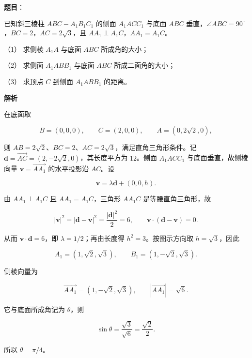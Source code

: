 \begin{answer}

\textbf{题目}：

已知斜三棱柱 $ABC-A_1B_1C_1$ 的侧面 $A_1ACC_1$ 与底面 $ABC$ 垂直，$\angle ABC=90^\circ$，$BC=2$，$AC=2\sqrt3$，且 $AA_1\perp A_1C$，$AA_1=A_1C$。

（1） 求侧棱 $A_1A$ 与底面 $ABC$ 所成角的大小；

（2） 求侧面 $A_1ABB_1$ 与底面 $ABC$ 所成二面角的大小；

（3） 求顶点 $C$ 到侧面 $A_1ABB_1$ 的距离。
\nopagebreak[4]
\begin{center}\end{center}
\nopagebreak[4]
\textbf{解析}

在底面取

\nopagebreak[4]
\[
B=(0,0,0),\qquad C=(2,0,0),\qquad A=(0,2\sqrt2,0),
\]

则 $AB=2\sqrt2$、$BC=2$、$AC=2\sqrt3$，满足直角三角形条件。记 $\boldsymbol d=\overrightarrow{AC}=(2,-2\sqrt2,0)$，其长度平方为 $12$。侧面 $A_1ACC_1$ 与底面垂直，故侧棱向量 $\boldsymbol v=\overrightarrow{AA_1}$ 的水平投影沿 $AC$。设

\nopagebreak[4]
\[
\boldsymbol v=\lambda\boldsymbol d+(0,0,h).
\]

由 $AA_1\perp A_1C$ 且 $AA_1=A_1C$，三角形 $AA_1C$ 是等腰直角三角形，故

\nopagebreak[4]
\[
|\boldsymbol v|^2=|\boldsymbol d-\boldsymbol v|^2=\frac{|\boldsymbol d|^2}{2}=6,
\qquad
\boldsymbol v\cdot(\boldsymbol d-\boldsymbol v)=0.
\]

从而 $\boldsymbol v\cdot\boldsymbol d=6$，即 $\lambda=1/2$；再由长度得 $h^2=3$。按图示方向取 $h=\sqrt3$，因此

\nopagebreak[4]
\[
A_1=(1,\sqrt2,\sqrt3),\qquad
B_1=(1,-\sqrt2,\sqrt3).
\]


侧棱向量为

\nopagebreak[4]
\[
\overrightarrow{AA_1}=(1,-\sqrt2,\sqrt3),
\qquad
|\overrightarrow{AA_1}|=\sqrt6.
\]

它与底面所成角记为 $\theta$，则

\nopagebreak[4]
\[
\sin\theta=\frac{\sqrt3}{\sqrt6}=\frac{\sqrt2}{2}.
\]

所以 $\theta=\pi/4$。


\end{answer}

